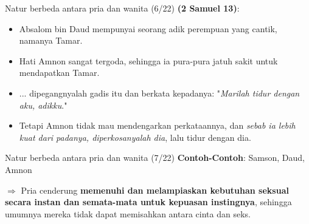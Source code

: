 \documentclass{beamer}
\theoremstyle{mystyle}
\let\emph\relax %
\begin{document}
\begin{frame}{Natur berbeda antara pria dan wanita (6/22)}
	\emph{Amnon} \textbf{(2 Samuel 13)}:  
	\begin{itemize}
		\item<2-> Absalom bin Daud mempunyai seorang adik perempuan yang cantik, namanya Tamar.
		\item<3-> Hati Amnon sangat tergoda, sehingga ia pura-pura jatuh sakit untuk mendapatkan Tamar.
		\item<4-> ... dipegangnyalah gadis itu dan berkata kepadanya: "\textit{Marilah tidur dengan aku, adikku}."
		\item<5-> Tetapi Amnon tidak mau mendengarkan perkataannya, dan \textit{sebab ia lebih kuat dari padanya, diperkosanyalah dia}, lalu tidur dengan dia.
	\end{itemize}		
	
\end{frame}


\begin{frame}{Natur berbeda antara pria dan wanita (7/22)}
		\onslide<2->\textbf{Contoh-Contoh}: Samson, Daud, Amnon 
		
		\bigskip
		 $\Longrightarrow$ Pria cenderung \textbf{memenuhi dan melampiaskan kebutuhan seksual secara instan dan semata-mata untuk kepuasan instingnya}, sehingga umumnya mereka tidak dapat memisahkan antara cinta dan seks.
\end{frame}

\end{document}

